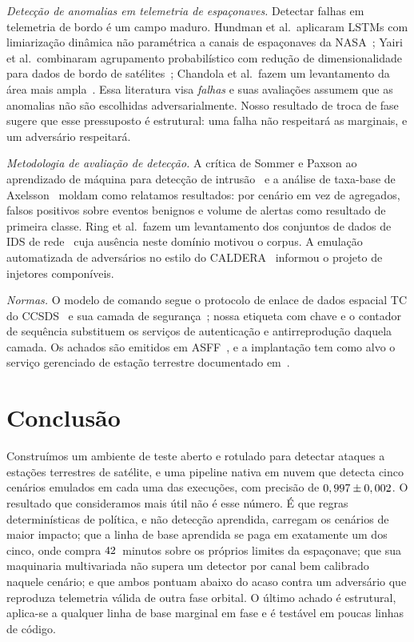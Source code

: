 \documentclass[conference]{IEEEtran}
\begin{document}
\emph{Detecção de anomalias em telemetria de espaçonaves.} Detectar falhas em
telemetria de bordo é um campo maduro. Hundman et al.\ aplicaram LSTMs com
limiarização dinâmica não paramétrica a canais de espaçonaves da
NASA~\cite{hundman2018lstm}; Yairi et al.\ combinaram agrupamento probabilístico
com redução de dimensionalidade para dados de bordo de
satélites~\cite{yairi2017datadriven}; Chandola et al.\ fazem um levantamento da
área mais ampla~\cite{chandola2009survey}. Essa literatura visa \emph{falhas} e
suas avaliações assumem que as anomalias não são escolhidas adversarialmente.
Nosso resultado de troca de fase sugere que esse pressuposto é estrutural: uma
falha não respeitará as marginais, e um adversário respeitará.

\emph{Metodologia de avaliação de detecção.} A crítica de Sommer e Paxson ao
aprendizado de máquina para detecção de intrusão~\cite{sommer2010closedworld} e
a análise de taxa-base de Axelsson~\cite{axelsson2000baserate} moldam como
relatamos resultados: por cenário em vez de agregados, falsos positivos sobre
eventos benignos e volume de alertas como resultado de primeira classe. Ring et
al.\ fazem um levantamento dos conjuntos de dados de IDS de
rede~\cite{ring2019datasets} cuja ausência neste domínio motivou o corpus. A
emulação automatizada de adversários no estilo do
CALDERA~\cite{applebaum2016caldera} informou o projeto de injetores
componíveis.

\emph{Normas.} O modelo de comando segue o protocolo de enlace de dados espacial
TC do CCSDS~\cite{ccsds232} e sua camada de segurança~\cite{ccsds355}; nossa
etiqueta com chave e o contador de sequência substituem os serviços de
autenticação e antirreprodução daquela camada. Os achados são emitidos em
ASFF~\cite{asff}, e a implantação tem como alvo o serviço gerenciado de estação
terrestre documentado em~\cite{awsgroundstation}.

\section{Conclusão}

Construímos um ambiente de teste aberto e rotulado para detectar ataques a
estações terrestres de satélite, e uma pipeline nativa em nuvem que detecta
cinco cenários emulados em cada uma das \expNumSeeds{} execuções, com precisão de
$0,997 \pm 0,002$. O resultado que consideramos mais útil não é
esse número. É que regras determinísticas de política, e não detecção aprendida,
carregam os cenários de maior impacto; que a linha de base aprendida se paga em
exatamente um dos cinco, onde compra $42$~minutos sobre os próprios
limites da espaçonave; que sua maquinaria multivariada não supera um detector
por canal bem calibrado naquele cenário; e que ambos pontuam abaixo do acaso
contra um adversário que reproduza telemetria válida de outra fase orbital.
O último achado é estrutural, aplica-se a qualquer linha de base marginal em
fase e é testável em poucas linhas de código.
\end{document}

